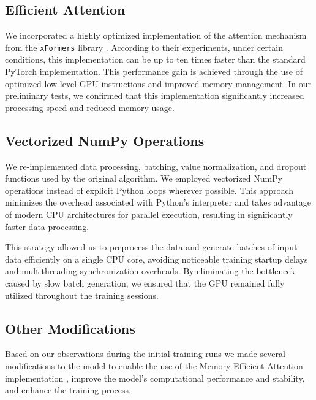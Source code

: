 \subsection{Efficient Attention}
\label{sec:efficient_attention}

We incorporated a highly optimized implementation of the attention mechanism from the \texttt{xFormers} library \cite{xFormers}. According to their experiments, under certain conditions, this implementation can be up to ten times faster than the standard PyTorch implementation. This performance gain is achieved through the use of optimized low-level GPU instructions and improved memory management. In our preliminary tests, we confirmed that this implementation significantly increased processing speed and reduced memory usage.

\subsection{Vectorized NumPy Operations}

We re-implemented data processing, batching, value normalization, and dropout functions used by the original  algorithm. We employed vectorized NumPy operations instead of explicit Python loops wherever possible. This approach minimizes the overhead associated with Python's interpreter and takes advantage of modern CPU architectures for parallel execution, resulting in significantly faster data processing.

This strategy allowed us to preprocess the data and generate batches of input data efficiently on a single CPU core, avoiding noticeable training startup delays and multithreading synchronization overheads. By eliminating the bottleneck caused by slow batch generation, we ensured that the GPU remained fully utilized throughout the training sessions.

\subsection{Other Modifications}
\label{sec:other_modifications}


Based on our observations during the initial training runs we made several modifications to the model to enable the use of the Memory-Efficient Attention implementation \cite{MemoryEfficientAttention}, improve the model's computational performance and stability, and enhance the training process.

